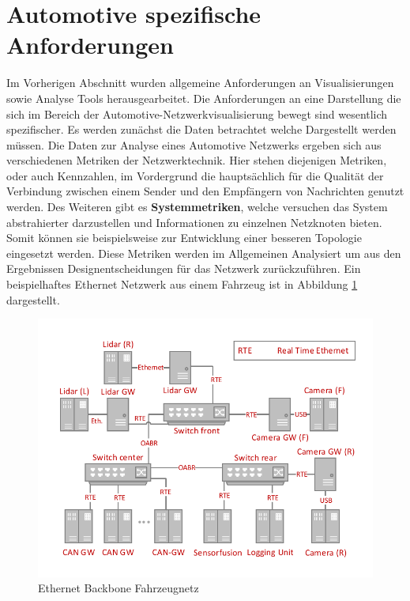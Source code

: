 \documentclass[draft=false
              ,paper=a4
              ,twoside=false
              ,fontsize=11pt
              ,headsepline
              ,BCOR10mm
              ,DIV11
              ]{scrbook}
\begin{document}
\section{Automotive spezifische Anforderungen} %
\label{sec:automotive_spezifische_anforderungen}
Im Vorherigen Abschnitt wurden allgemeine Anforderungen an Visualisierungen sowie Analyse Tools herausgearbeitet. Die Anforderungen an eine Darstellung die sich im Bereich der Automotive-Netzwerkvisualisierung bewegt sind wesentlich spezifischer. Es werden zunächst die Daten betrachtet welche Dargestellt werden müssen. Die Daten zur Analyse eines Automotive Netzwerks ergeben sich aus verschiedenen Metriken der Netzwerktechnik. Hier stehen diejenigen Metriken, oder auch Kennzahlen, im Vordergrund die hauptsächlich für die Qualität der Verbindung zwischen einem Sender und den Empfängern von Nachrichten genutzt werden. Des Weiteren gibt es \textbf{Systemmetriken}, welche versuchen das System abstrahierter darzustellen und Informationen zu einzelnen Netzknoten bieten. Somit können sie beispielsweise zur Entwicklung einer besseren Topologie eingesetzt werden. Diese Metriken werden im Allgemeinen Analysiert um aus den Ergebnissen Designentscheidungen für das Netzwerk zurückzuführen. Ein beispielhaftes Ethernet Netzwerk aus einem Fahrzeug ist in Abbildung \ref{fig:carnet} dargestellt. 
\begin{figure}[htb]
  \begin{center}
    \includegraphics[width=\textwidth]{img/carnet}
  \end{center}
  \caption{Ethernet Backbone Fahrzeugnetz \cite{b-vkaen-15}}
  \label{fig:carnet}
\end{figure}
\end{document}
